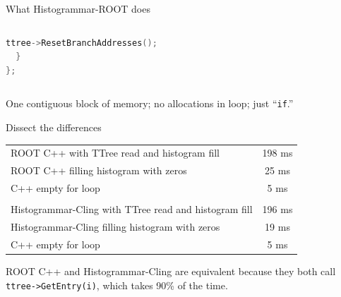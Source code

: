 \documentclass{beamer}
\begin{document}
\begin{frame}[fragile]{What Histogrammar-ROOT does}
\begin{columns}
\begin{lstlisting}[language=cpp, basicstyle=\ttfamily\fontsize{5}{4}\selectfont]
    ttree->ResetBranchAddresses();
  }
};
\end{lstlisting}
\end{columns}

One contiguous block of memory; no allocations in loop; just ``{\tt\scriptsize if}.''
\end{frame}

\begin{frame}{Dissect the differences}
\vspace{0.5 cm}
\renewcommand{\arraystretch}{1.2}
\begin{tabular}{l c}
ROOT C++ with TTree read and histogram fill & 198 ms \\
ROOT C++ filling histogram with zeros & 25 ms \\
C++ empty for loop & 5 ms \\
 & \\
Histogrammar-Cling with TTree read and histogram fill & 196 ms \\
Histogrammar-Cling filling histogram with zeros & 19 ms \\
C++ empty for loop & 5 ms \\
\end{tabular}

\vspace{1 cm}
ROOT C++ and Histogrammar-Cling are equivalent because they both call {\tt\small ttree->GetEntry(i)}, which takes 90\% of the time.
\end{frame}
\end{document}
